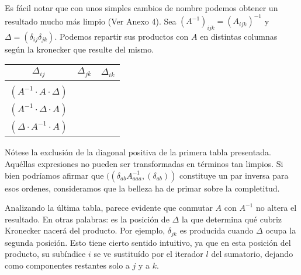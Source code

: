 \vspace{0.5cm}

Es fácil notar que con unos simples cambios de nombre podemos obtener un resultado mucho más limpio (Ver Anexo 4). Sea $(A^{-1})_{ijk} = (A_{ijk})^{-1}$ y $\Delta = (\delta_{ij}\delta_{jk})$. Podemos repartir sus productos con $A$ en distintas columnas según la kronecker que resulte del mismo.

\vspace{0.5cm}
\begin{tabular}{ |c|c|c| } 
	\hline
	$\Delta_{ij}$ & $\Delta_{jk}$ & $\Delta_{ik}$ \\
	\hline
	\makecell{$(A \cdot A^{-1} \cdot \Delta)$ \\ $(A^{-1} \cdot A \cdot \Delta)$} &
	\makecell{$(A \cdot \Delta \cdot A^{-1})$ \\ $(A^{-1} \cdot \Delta \cdot A)$} &
	\makecell{$(\Delta \cdot A \cdot A^{-1})$ \\ $(\Delta \cdot A^{-1} \cdot A)$} \\
	\hline
\end{tabular}
\vspace{0.5cm}

Nótese la exclusión de la diagonal positiva de la primera tabla presentada. Aquéllas expresiones no pueden ser transformadas en términos tan limpios. Si bien podríamos afirmar que $((\delta_{ab} A^{-1}_{aaa}, (\delta_{ab}))$ constituye un par inversa para esos ordenes, consideramos que la belleza ha de primar sobre la completitud.

Analizando la última tabla, parece evidente que conmutar $A$ con $A^{-1}$ no altera el resultado. En otras palabras: es la posición de $\Delta$ la que determina qué cubriz Kronecker nacerá del producto. Por ejemplo, $\delta_{jk}$ es producida cuando $\Delta$ ocupa la segunda posición. Esto tiene cierto sentido intuitivo, ya que en esta posición del producto, su subíndice $i$ se ve sustituído por el iterador $l$ del sumatorio, dejando como componentes restantes solo a $j$ y a $k$.

\newpage
